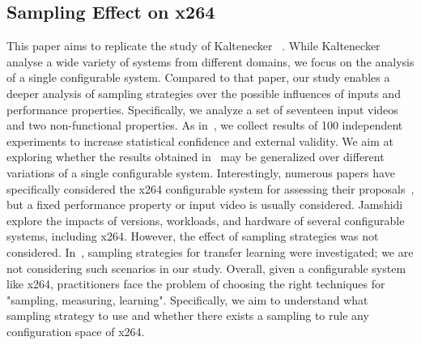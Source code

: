 \subsection{Sampling Effect on x264} 



 This paper aims to replicate the study of Kaltenecker \etal~\cite{kaltenecker2019}.
While Kaltenecker \etal analyse a wide variety of systems from different domains, we focus on the analysis of a single configurable system.
 Compared to that paper, our study enables a deeper analysis of sampling strategies over the possible influences of inputs and performance properties. Specifically, we analyze a set of seventeen input videos and two non-functional properties. As in~\cite{kaltenecker2019}, we collect results of 100 independent experiments to increase statistical confidence and external validity.
We aim at exploring whether the results obtained in~\cite{kaltenecker2019} may be generalized over different variations of a single configurable system.
Interestingly, numerous papers have specifically considered the x264 configurable system for assessing their proposals~\cite{julianasurvey,jamshidi2018,jamshidi2017b,sarkar2015, valov2015,valov2017,jehooh2017,temple2017a,guo2013ASE}, but a fixed performance property or input video is usually considered. %
Jamshidi \etal~\cite{jamshidi2017b} explore the impacts of versions, workloads, and hardware of several configurable systems, including x264. However, the effect of sampling strategies was not considered. In~\cite{jamshidi2018}, sampling strategies for transfer learning were investigated; we are not considering such scenarios in our study.
Overall, given a configurable system like x264, practitioners face the problem of choosing the right techniques for "sampling, measuring, learning". Specifically, we aim to understand what sampling strategy to use and whether there exists a sampling to rule any configuration space of x264. 

